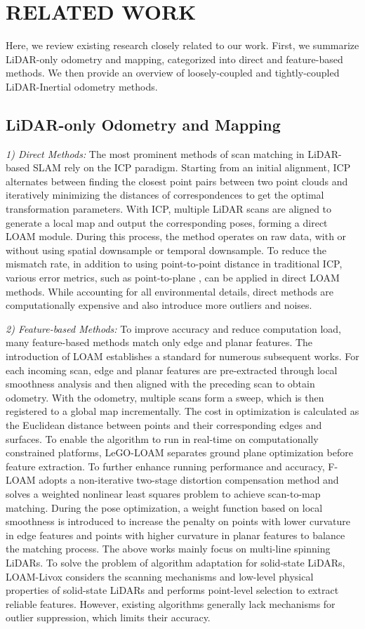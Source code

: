 \section{RELATED WORK}
Here, we review existing research closely related to our work. First, we summarize LiDAR-only odometry and mapping, categorized into direct and feature-based methods. We then provide an overview of loosely-coupled and tightly-coupled LiDAR-Inertial odometry methods.
\subsection{LiDAR-only Odometry and Mapping}
\emph{1) Direct Methods:}
The most prominent methods of scan matching in LiDAR-based SLAM rely on the ICP \cite{121791} paradigm. Starting from an initial alignment, ICP alternates between finding the closest point pairs between two point clouds and iteratively minimizing the distances of correspondences to get the optimal transformation parameters. With ICP, multiple LiDAR scans are aligned to generate a local map and output the corresponding poses, forming a direct LOAM module. During this process, the method operates on raw data, with or without using spatial downsample or temporal downsample. To reduce the mismatch rate, in addition to using point-to-point distance in traditional ICP, various error metrics, such as point-to-plane \cite{132043}, can be applied in direct LOAM methods. While accounting for all environmental details, direct methods are computationally expensive and also introduce more outliers and noises.

\emph{2) Feature-based Methods:}
To improve accuracy and reduce computation load, many feature-based methods match only edge and planar features. The introduction of LOAM \cite{zhang2017low} establishes a standard for numerous subsequent works. For each incoming scan, edge and planar features are pre-extracted through local smoothness analysis and then aligned with the preceding scan to obtain odometry. With the odometry, multiple scans form a sweep, which is then registered to a global map incrementally. The cost in optimization is calculated as the Euclidean distance between points and their corresponding edges and surfaces.
To enable the algorithm to run in real-time on computationally constrained platforms, LeGO-LOAM \cite{8594299} separates ground plane optimization before feature extraction. To further enhance running performance and accuracy, F-LOAM \cite{9636655} adopts a non-iterative two-stage distortion compensation method and solves a weighted nonlinear least squares problem to achieve scan-to-map matching. During the pose optimization, a weight function based on local smoothness is introduced to increase the penalty on points with lower curvature in edge features and points with higher curvature in planar features to balance the matching process. 
The above works \cite{8594299, 9636655, zhang2017low} mainly focus on multi-line spinning LiDARs. To solve the problem of algorithm adaptation for solid-state LiDARs, LOAM-Livox \cite{9197440} considers the scanning mechanisms and low-level physical properties of solid-state LiDARs and performs point-level selection to extract reliable features. However, existing algorithms generally lack mechanisms for outlier suppression, which limits their accuracy. 
